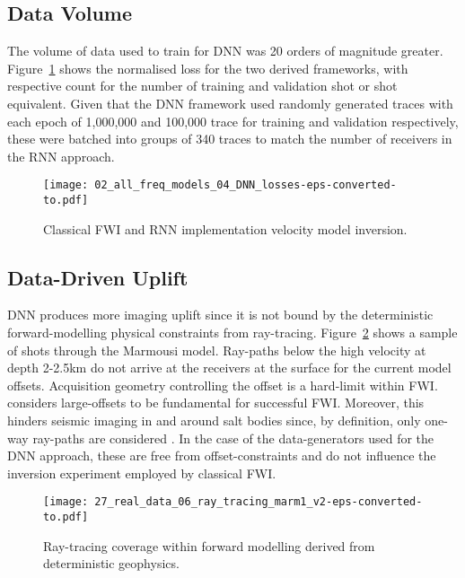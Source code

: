 {\subsection{Data Volume}
The volume of data used to train for DNN was 20 orders of magnitude greater. Figure~\ref{fig:dnn_rnn_losses} shows the normalised loss for the two derived frameworks, with respective count for the number of training and validation shot or shot equivalent. Given that the DNN framework used randomly generated traces with each epoch of 1,000,000 and 100,000 trace for training and validation respectively, these were batched into groups of 340 traces to match the number of receivers in the RNN approach.

\begin{figure}[ht!]
    \centering
    \texttt{[image: 02\_all\_freq\_models\_04\_DNN\_losses-eps-converted-to.pdf]}
    \caption[Classical FWI and RNN implementation velocity model inversion.]{Classical FWI and RNN implementation velocity model inversion.}
    \label{fig:dnn_rnn_losses}
\end{figure}

\subsection{Data-Driven Uplift}
DNN produces more imaging uplift since it is not bound by the deterministic forward-modelling physical constraints from ray-tracing. Figure~\ref{fig:fwi_ray_tracing} shows a sample of shots through the Marmousi model. Ray-paths below the high velocity at depth 2-2.5km do not arrive at the receivers at the surface for the current model offsets. Acquisition geometry controlling the offset is a hard-limit within FWI. \citet{Morgan2009} considers large-offsets to be fundamental for successful FWI. Moreover, this hinders seismic imaging in and around salt bodies since, by definition, only one-way ray-paths are considered \citep{Jones2014}. In the case of the data-generators used for the DNN approach, these are free from offset-constraints and do not influence the inversion experiment employed by classical FWI.


\begin{figure}[ht!]
    \centering
    \texttt{[image: 27\_real\_data\_06\_ray\_tracing\_marm1\_v2-eps-converted-to.pdf]}
    \caption[Ray-tracing coverage within forward modelling]{Ray-tracing coverage within forward modelling derived from deterministic geophysics.}
    \label{fig:fwi_ray_tracing}
\end{figure}

}
